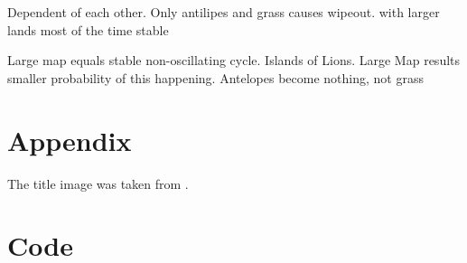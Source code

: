 \documentclass[11pt]{article}
\begin{document}
Dependent of each other. 
Only antilipes and grass causes wipeout. with larger lands most of the time stable

Large map equals stable non-oscillating cycle. 
Islands of Lions. Large Map results smaller probability of this happening. 
Antelopes become nothing, not grass

\appendix

\section{Appendix}
The title image was taken from \cite{titleImage}.

\section{Code}



\end{document}
